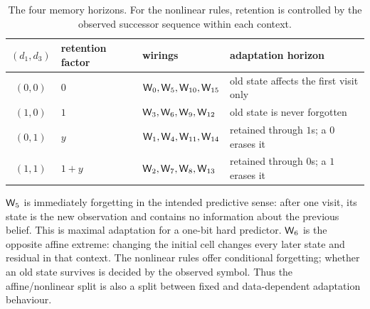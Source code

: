 \begin{table}[ht]
\centering\small
\begin{tabular}{@{}clll@{}}
\toprule
$(d_1,d_3)$ & retention factor & wirings & adaptation horizon\\
\midrule
$(0,0)$ & $0$ & $\mathsf{W}_{0},\mathsf{W}_{5},\mathsf{W}_{10},\mathsf{W}_{15}$ & old state affects the first visit only\\
$(1,0)$ & $1$ & $\mathsf{W}_{3},\mathsf{W}_{6},\mathsf{W}_{9},\mathsf{W}_{12}$ & old state is never forgotten\\
$(0,1)$ & $y$ & $\mathsf{W}_{1},\mathsf{W}_{4},\mathsf{W}_{11},\mathsf{W}_{14}$ & retained through $1$s; a $0$ erases it\\
$(1,1)$ & $1+y$ & $\mathsf{W}_{2},\mathsf{W}_{7},\mathsf{W}_{8},\mathsf{W}_{13}$ & retained through $0$s; a $1$ erases it\\
\bottomrule
\end{tabular}
\caption{The four memory horizons.  For the nonlinear rules, retention is controlled by the
observed successor sequence within each context.}
\label{tab:adaptation-new}
\end{table}

$\mathsf{W}_{5}$ is immediately forgetting in the intended predictive sense: after one visit, its state is
the new observation and contains no information about the previous belief.  This is maximal
adaptation for a one-bit hard predictor.  $\mathsf{W}_{6}$ is the opposite affine extreme: changing the
initial cell changes every later state and residual in that context.  The nonlinear rules offer
conditional forgetting; whether an old state survives is decided by the observed symbol.  Thus
the affine/nonlinear split is also a split between fixed and data-dependent adaptation behaviour.
